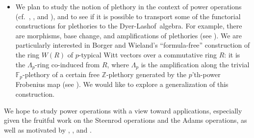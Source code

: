 \documentclass{rs}
\theoremstyle{definition}
\theoremstyle{remark}
\newcommand{\mb}[1]{\mathbb{#1}}
\newcommand{\DL}{Dyer-Lashof~}
\newcommand{\BF}{{\mb F}}
\newcommand{\BZ}{{\mb Z}}
\begin{document}
\begin{itemize}
 \item We plan to study the notion of plethory \cite{BW} in the context of power operations (cf.~\cite[Sections 4-6]{cong}, \cite{staceywhitehouse}, and \cite{bauer}), 
 and to see if it is possible to transport some of the functorial constructions for plethories to the \DL algebra.  
 For example, there are morphisms, base change, and amplifications of plethories (see \cite[1.8, 1.13, and Theorem 7.1]{BW}).  
 We are particularly interested in Borger and Wieland's ``formula-free'' construction 
 of the ring $W(R)$ of $p$-typical Witt vectors over a commutative ring $R$: 
 it is the $\Lambda_p$-ring co-induced from $R$, 
 where $\Lambda_p$ is the amplification along the trivial $\BF_p$-plethory 
 of a certain free $\BZ$-plethory generated by the $p$'th-power Frobenius map (see \cite[Section 12]{BW}).  
 We would like to explore a generalization of this construction.  
\end{itemize}

We hope to study power operations with a view toward applications, 
especially given the fruitful work on the Steenrod operations and the Adams operations, 
as well as motivated by \cite[Lemma 14 and Remark 1]{hopkins}, \cite{davis}, and \cite{behrenslec}.  
\end{document}
